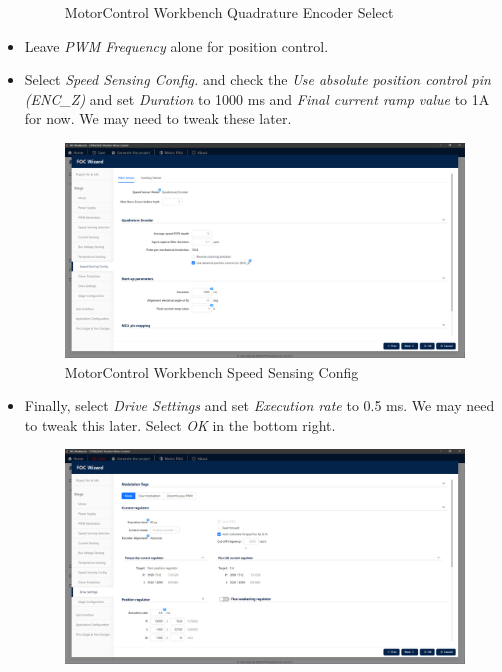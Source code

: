 \documentclass[10pt]{article}
\begin{document}
\begin{itemize}
\begin{figure}[H]
                        \caption{MotorControl Workbench Quadrature Encoder Select}
                    \end{figure}
                \item Leave \emph{PWM Frequency} alone for position control.
                \item Select \emph{Speed Sensing Config.} and check the \emph{Use absolute position control pin (ENC\_Z)} and set \emph{Duration} to 1000 ms and \emph{Final current ramp value} to 1A for now. We may need to tweak these later.
                    \begin{figure}[H]
                        \centerline{\includegraphics[width=\textwidth]{References/MCW Position Speed Sensing Config.png}}
                        \caption{MotorControl Workbench Speed Sensing Config}
                    \end{figure}
                \item Finally, select \emph{Drive Settings} and set \emph{Execution rate} to 0.5 ms. We may need to tweak this later. Select \emph{OK} in the bottom right.
                    \begin{figure}[H]
                        \centerline{\includegraphics[width=\textwidth]{References/MCW Position Drive Settings.png}}

\end{figure}
\end{itemize}
\end{document}
